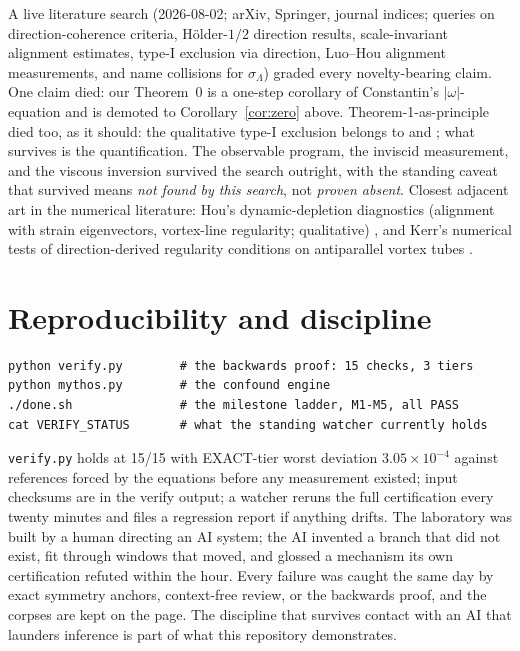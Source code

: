 \documentclass[11pt]{article}
\newcommand{\om}{\omega}
\newcommand{\sL}{\sigma_{\!\Lambda}}
\begin{document}
A live literature search (2026-08-02; arXiv, Springer, journal indices;
queries on direction-coherence criteria, H\"older-$1/2$ direction results,
scale-invariant alignment estimates, type-I exclusion via direction,
Luo--Hou alignment measurements, and name collisions for $\sL$) graded
every novelty-bearing claim. One claim died: our Theorem~0 is a one-step
corollary of Constantin's $|\om|$-equation and is demoted to
Corollary~\ref{cor:zero} above. Theorem-1-as-principle died too, as it
should: the qualitative type-I exclusion belongs to \cite{GM11} and
\cite{BP20}; what survives is the quantification. The observable program,
the inviscid measurement, and the viscous inversion survived the search
outright, with the standing caveat that survived means \emph{not found by
this search}, not \emph{proven absent}. Closest adjacent art in the
numerical literature: Hou's dynamic-depletion diagnostics (alignment with
strain eigenvectors, vortex-line regularity; qualitative)
\cite{Hou09,LH14}, and Kerr's numerical tests of direction-derived
regularity conditions on antiparallel vortex tubes \cite{Kerr13}.

\section{Reproducibility and discipline}\label{sec:repro}

\begin{verbatim}
python verify.py        # the backwards proof: 15 checks, 3 tiers
python mythos.py        # the confound engine
./done.sh               # the milestone ladder, M1-M5, all PASS
cat VERIFY_STATUS       # what the standing watcher currently holds
\end{verbatim}

\texttt{verify.py} holds at 15/15 with EXACT-tier worst deviation
$3.05\times10^{-4}$ against references forced by the equations before any
measurement existed; input checksums are in the verify output; a watcher
reruns the full certification every twenty minutes and files a regression
report if anything drifts. The laboratory was built by a human directing
an AI system; the AI invented a branch that did not exist, fit through
windows that moved, and glossed a mechanism its own certification refuted
within the hour. Every failure was caught the same day by exact symmetry
anchors, context-free review, or the backwards proof, and the corpses are
kept on the page. The discipline that survives contact with an AI that
launders inference is part of what this repository demonstrates.
\end{document}

